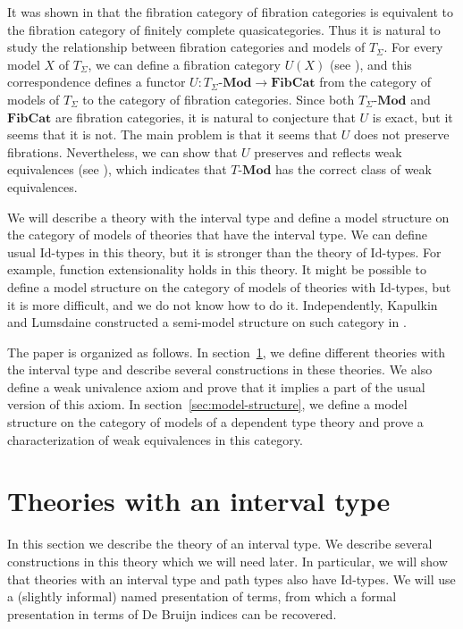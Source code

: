 \documentclass[reqno]{amsart}
\theoremstyle{definition}
\theoremstyle{remark}
\newcommand{\Id}{\mathrm{Id}}
\newcommand{\cat}[1]{\mathbf{#1}}
\newcommand{\Mod}[1]{#1\text{-}\cat{Mod}}
\numberwithin{figure}{section}
\begin{document}
It was shown in \cite{szumilo} that the fibration category of fibration categories is equivalent to the fibration category of finitely complete quasicategories.
Thus it is natural to study the relationship between fibration categories and models of $T_\Sigma$.
For every model $X$ of $T_\Sigma$, we can define a fibration category $U(X)$ (see \cite{tt-fibr-cat}), and this correspondence defines a functor $U : \Mod{T_\Sigma} \to \cat{FibCat}$
from the category of models of $T_\Sigma$ to the category of fibration categories.
Since both $\Mod{T_\Sigma}$ and $\cat{FibCat}$ are fibration categories, it is natural to conjecture that $U$ is exact, but it seems that it is not.
The main problem is that it seems that $U$ does not preserve fibrations.
Nevertheless, we can show that $U$ preserves and reflects weak equivalences (see ), which indicates that $\Mod{T}$ has the correct class of weak equivalences.

We will describe a theory with the interval type and define a model structure on the category of models of theories that have the interval type.
We can define usual $\Id$-types in this theory, but it is stronger than the theory of $\Id$-types.
For example, function extensionality holds in this theory.
It might be possible to define a model structure on the category of models of theories with $\Id$-types,
but it is more difficult, and we do not know how to do it.
Independently, Kapulkin and Lumsdaine constructed a semi-model structure on such category in \cite{kap-lum-model}.

The paper is organized as follows.
In section~\ref{sec:HoTT-I}, we define different theories with the interval type and describe several constructions in these theories.
We also define a weak univalence axiom and prove that it implies a part of the usual version of this axiom.
In section~\ref{sec:model-structure}, we define a model structure on the category of models of a dependent type theory
and prove a characterization of weak equivalences in this category.

\section{Theories with an interval type}
\label{sec:HoTT-I}

In this section we describe the theory of an interval type.
We describe several constructions in this theory which we will need later.
In particular, we will show that theories with an interval type and path types also have $\Id$-types.
We will use a (slightly informal) named presentation of terms,
from which a formal presentation in terms of De Bruijn indices can be recovered.
\end{document}
